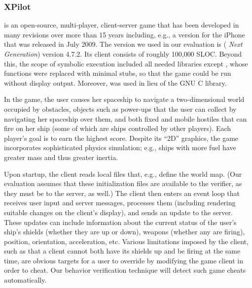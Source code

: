 \subsubsection{XPilot}
\xpilot is an open-source, multi-player, client-server game that has
been developed in many revisions over more than 15 years including,
e.g., a version for the iPhone that was released in July 2009.  The
version we used in our evaluation is \xpilotng (\textit{\xpilot
Next Generation}) version 4.7.2.  Its client consists of roughly 100,000 SLOC.
Beyond this, the scope of symbolic execution included all needed
libraries except \xlib, whose functions were replaced with minimal
stubs, so that the game could be run without display output.
Moreover, \uclibc was used in lieu of the GNU C library.

In the game, the user causes her spaceship to navigate a
two-dimensional world occupied by obstacles, objects such as power-ups
that the user can collect by navigating her spaceship over them, and
both fixed and mobile hostiles that can fire on her ship (some of
which are ships controlled by other players).  Each player's goal is
to earn the highest score.  Despite its ``2D'' graphics, the game
incorporates sophisticated physics simulation; e.g., ships with more
fuel have greater mass and thus greater inertia.

Upon startup, the \xpilot client reads local files that, e.g., define
the world map.  (Our evaluation assumes that these initialization files
are available to the verifier, as they must be to the server, as well.)
The \xpilot client then enters an event loop that receives
user input and server messages, processes them (including rendering
suitable changes on the client's display), and sends an update to the
server.  These updates can include information about the current
status of the user's ship's shields (whether they are up or down),
weapons (whether any are firing), position, orientation, acceleration,
etc.  Various limitations imposed by the client, such as that a client
cannot both have its shields up and be firing at the same time, are
obvious targets for a user to override by modifying the game client in
order to cheat.  Our behavior verification technique will detect
such game cheats automatically.

